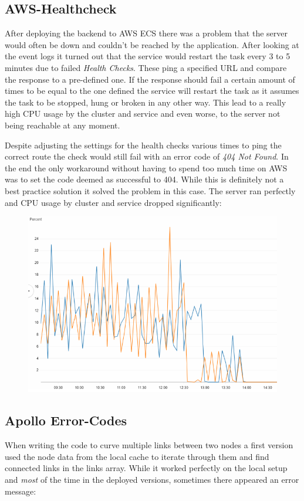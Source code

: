 \subsection{AWS-Healthcheck}
After deploying the backend to AWS ECS there was a problem that the server would often be down and couldn't be reached by the application. After looking at the event logs it turned out that the service would restart the task every 3 to 5 minutes due to failed \emph{Health Checks}. These ping a specified URL and compare the response to a pre-defined one. If the response should fail a certain amount of times to be equal to the one defined the service will restart the task as it assumes the task to be stopped, hung or broken in any other way. This lead to a really high CPU usage by the cluster and service and even worse, to the server not being reachable at any moment.

Despite adjusting the settings for the health checks various times to ping the correct route the check would still fail with an error code of \emph{404 Not Found}. In the end the only workaround without having to spend too much time on AWS was to set the code deemed as successful to 404. While this is definitely not a best practice solution it solved the problem in this case. The server ran perfectly and CPU usage by cluster and service dropped significantly:
\begin{figure}[H]
\centering
\includegraphics[scale=.6]{Bilder/AwsCpuReduction.png}
\end{figure}

\subsection{Apollo Error-Codes}
When writing the code to curve multiple links between two nodes a first version used the node data from the local cache to iterate through them and find connected links in the links array. While it worked perfectly on the local setup and \emph{most} of the time in the deployed versions, sometimes there appeared an error message: \\

